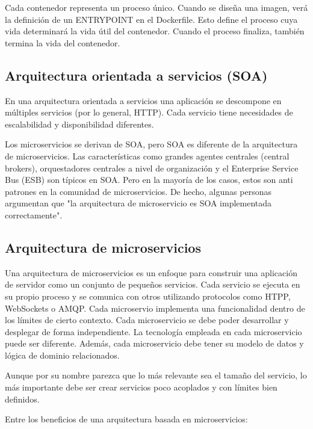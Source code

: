 \documentclass[11pt,a4paper]{article}
\begin{document}
Cada contenedor representa un proceso único. Cuando se diseña una imagen, verá la definición de un ENTRYPOINT en el Dockerfile. Esto define el proceso cuya vida determinará la vida útil del contenedor. Cuando el proceso finaliza, también termina la vida del contenedor.

\subsection{Arquitectura orientada a servicios (SOA)}

En una arquitectura orientada a servicios una aplicación se descompone en múltiples servicios (por lo general, HTTP). Cada servicio tiene necesidades de escalabilidad y disponibilidad diferentes.

Los microservicios se derivan de SOA, pero SOA es diferente de la arquitectura de microservicios. Las características como grandes agentes centrales (central brokers), orquestadores centrales a nivel de organización y el Enterprise Service Bus (ESB) son típicos en SOA. Pero en la mayoría de los casos, estos son anti patrones en la comunidad de microservicios. De hecho, algunas personas argumentan que "la arquitectura de microservicio es SOA implementada correctamente".

\subsection{Arquitectura de microservicios}

Una arquitectura de microservicios es un enfoque para construir una aplicación de servidor como un conjunto de pequeños servicios. Cada servicio se ejecuta en su propio proceso y se comunica con otros utilizando protocolos como HTPP, WebSockets o AMQP. Cada microservio implementa una funcionalidad dentro de los límites de cierto contexto. Cada microservicio se debe poder desarrollar y desplegar de forma independiente. La tecnología empleada en cada microservicio puede ser diferente. Además, cada microservicio debe tener su modelo de datos y lógica de dominio relacionados.

Aunque por su nombre parezca que lo más relevante sea el tamaño del servicio, lo más importante debe ser crear servicios poco acoplados y con límites bien definidos.

Entre los beneficios de una arquitectura basada en microservicios:
\end{document}
